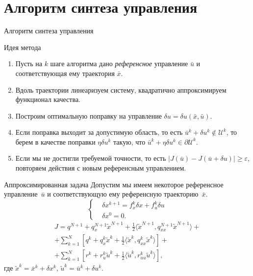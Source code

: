     \section{Алгоритм синтеза управления}

    \begin{frame}{Алгоритм синтеза управления}
        \begin{block}{Идея метода}
            \begin{enumerate}
                \item Пусть на $k$ шаге алгоритма дано \textit{референсное} управление $\bar u$ и соответствующая ему траектория $\bar x$.
                \item Вдоль траектории линеаризуем систему, квадратично аппроксимируем функционал качества.
                \item Построим оптимальную поправку на управление {\centering $\delta u = \delta u(\bar x, \bar u).$}
                \item Если поправка выходит за допустимую область, то есть $\bar u^k + \delta u^k \notin \mathcal{U}^k$, то берем в качестве поправки $\eta\delta u^k$ такую, что {\centering $\bar u^k + \eta\delta u^k \in \partial \mathcal{U}^k.$}
                \item Если мы не достигли требуемой точности, то есть $|J(\bar u) - J(\bar u + \delta u)| \geqslant \varepsilon$, повторяем действия с новым референсным управлением.
            \end{enumerate}
        \end{block}
    \end{frame}

    \begin{frame}{Аппроксимированная задача}
        Допустим мы имеем некоторое референсное управление~$\bar u$ и соответствующую ему референсную траекторию~$\bar x$.
        \begin{equation}\label{eq:ref-system}
            \left\{\begin{aligned}
                &\delta x^{k+1} = f_x^k \delta x + f_u^k \delta u \\
                &\delta x^0 = 0.
            \end{aligned}\right.
        \end{equation}
        \begin{multline}\label{eq:ref-cost}
            J = q^{N+1} + q_x^{N+1}\tilde x^{N+1} + \frac{1}{2}\langle \tilde x^{N+1}, q_{xx}^{N+1}\tilde x^{N+1} \rangle
            + \\ +
            \sum_{k=1}^{N}\left[ q^{k} + q_x^{k}\tilde x^{k} + \frac{1}{2}\langle \tilde x^{k}, q_{xx}^{k}\tilde x^{k} \rangle \right]
            + \\ +
            \sum_{k=1}^{N}\left[ r^{k} + r_u^{k}\tilde u^{k} + \frac{1}{2}\langle \tilde u^{k}, r_{uu}^{k}\tilde u^{k} \rangle \right],
        \end{multline}
        где $\tilde x^k = \bar x^k + \delta x^k$, $\tilde u^k = \bar u^k + \delta u^k$.
    \end{frame}

